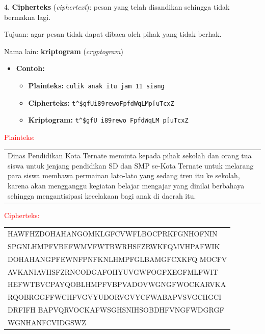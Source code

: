\documentclass{article}
\begin{document}
\newpage


4. \textbf{Cipherteks} (\textit{ciphertext}): pesan yang telah disandikan sehingga tidak bermakna lagi.

Tujuan: agar pesan tidak dapat dibaca oleh pihak yang tidak berhak.

Nama lain: \textbf{kriptogram} (\textit{cryptogram})

\begin{itemize}
    \item \textbf{Contoh:}
    \begin{itemize}
        \item \textbf{Plainteks:} \texttt{culik anak itu jam 11 siang}
        \item \textbf{Cipherteks:} \texttt{t\textasciicircum\$gfUi89rewoFpfdWqLMp[uTcxZ}
        \item \textbf{Kriptogram:} \texttt{t\textasciicircum\$gfU i89rewo FpfdWqLM p[uTcxZ}
    \end{itemize}
\end{itemize}

\newpage


\textcolor{red}{Plainteks:}\vspace{2mm}
\begin{center}
\begin{tabular}{|p{}|}
\hline
Dinas Pendidikan Kota Ternate meminta kepada pihak sekolah dan orang tua siswa untuk jenjang pendidikan SD dan SMP se-Kota Ternate untuk melarang para siswa membawa permainan lato-lato yang sedang tren itu ke sekolah, karena akan mengganggu kegiatan belajar mengajar yang dinilai berbahaya sehingga mengantisipasi kecelakaan bagi anak di daerah itu.\hline
\end{tabular}
\end{center}
\vspace{10mm}
\textcolor{red}{Cipherteks:}\vspace{2mm}
\begin{center}
\begin{tabular}{|p{}|}
\hline
HAWFHZDOHAHANGOMKLGFCVWFLBOCPRKFGNHOFNIN \\ SPGNLHMPFVBEFWMVFWTBWRHSFZRWKFQMVHPAFWIK \\ DOHAHANGPFEWNFPNFKNLHMPFGLBAMGFCXKFQ MOCFV \\ AVKANIAVHSFZRNCODGAFOHYUVGWFOGFXEGFMLFWIT \\ HEFWTBVCPAYQOBLHMPFVBPVADOVWGNGFWOCKARVKA \\ RQOBRGGFFWCHFVGVYUDORVGVYCFWABAPVSVGCHGCI \\ DRFIFH BAPVQRVOCKAFWSGHSNIHSOBDHFVNGFWDGRGF \\ WGNHANFCVIDGSWZ \hline
\end{tabular}
\end{center}
\end{document}
